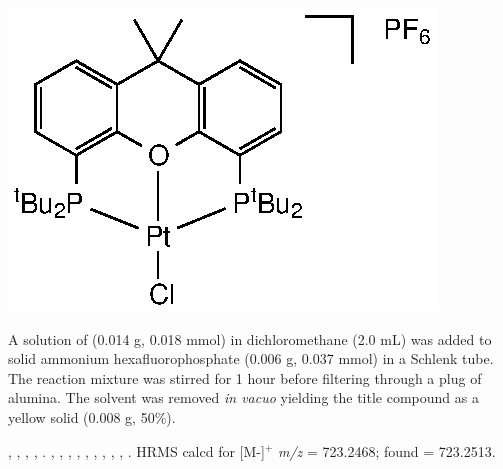 \begin{structure}[h]
\begin{center}
\includegraphics{../Structures/CtBuPtClPF6.eps}
\end{center}
\end{structure}

A solution of \tBuxantphos{} (0.014 g, 0.018 mmol) in dichloromethane (2.0 mL) was added to solid ammonium hexafluorophosphate (0.006 g, 0.037 mmol) in a Schlenk tube.  The reaction mixture was stirred for 1 hour before filtering through a plug of alumina.  The solvent was removed \emph{in vacuo} yielding the title compound as a yellow solid (0.008 g, 50\%).  

,
,
,
,
.
,
,
,
,
,
,
,
,
,
.
HRMS calcd for  [M-]$^+$ \emph{m/z} = 723.2468; found = 723.2513.

